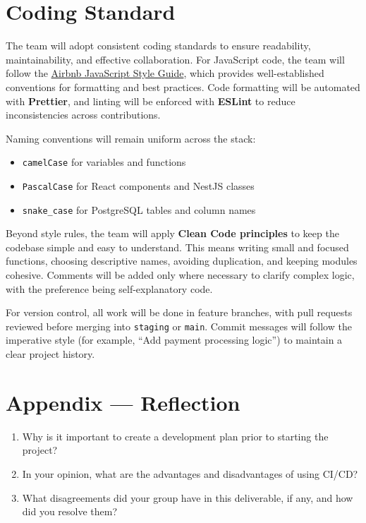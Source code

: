 \documentclass{article}
\begin{document}

\section{Coding Standard}

The team will adopt consistent coding standards to ensure readability, maintainability, and effective collaboration. For JavaScript code, the team will follow the \href{https://github.com/airbnb/javascript}{Airbnb JavaScript Style Guide}, which provides well-established conventions for formatting and best practices. Code formatting will be automated with \textbf{Prettier}, and linting will be enforced with \textbf{ESLint} to reduce inconsistencies across contributions.

Naming conventions will remain uniform across the stack:
\begin{itemize}
  \item \texttt{camelCase} for variables and functions
  \item \texttt{PascalCase} for React components and NestJS classes
  \item \texttt{snake\_case} for PostgreSQL tables and column names
\end{itemize}

Beyond style rules, the team will apply \textbf{Clean Code principles} to keep the codebase simple and easy to understand. This means writing small and focused functions, choosing descriptive names, avoiding duplication, and keeping modules cohesive. Comments will be added only where necessary to clarify complex logic, with the preference being self-explanatory code.

For version control, all work will be done in feature branches, with pull requests reviewed before merging into \texttt{staging} or \texttt{main}. Commit messages will follow the imperative style (for example, “Add payment processing logic”) to maintain a clear project history.

\newpage{}

\section*{Appendix --- Reflection}




\begin{enumerate}
    \item Why is it important to create a development plan prior to starting the
    project?
    \item In your opinion, what are the advantages and disadvantages of using
    CI/CD?
    \item What disagreements did your group have in this deliverable, if any,
    and how did you resolve them?
\end{enumerate}
\end{document}
